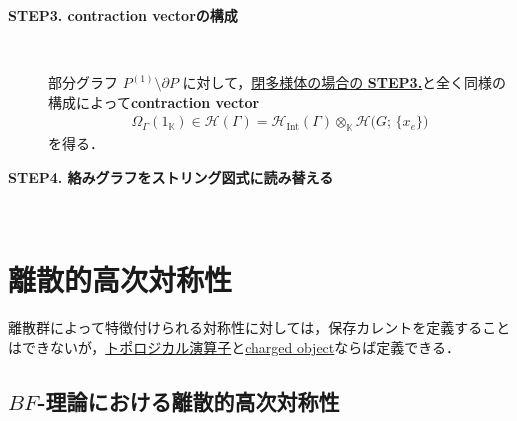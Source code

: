 \documentclass[TQFT_main]{subfiles}
\begin{document}
\begin{description}
    \item[\textbf{STEP3. contraction vectorの構成}]　
    
    部分グラフ $P^{(1)} \setminus \partial P$ に対して，\hyperref[TV:STEP3]{閉多様体の場合の \textsf{\textbf{STEP3.}}}と全く同様の構成によって\textbf{contraction vector}
    \begin{align}
        \Omega_\Gamma (1_{\mathbb{K}}) \in \mathcal{H} (\Gamma) = \mathcal{H}_{\text{Int}} (\Gamma) \otimes_{\mathbb{K}} \mathcal{H} \bigl(G;\, \{x_e\}\bigr)
    \end{align}
    を得る．

    \item[\textbf{STEP4. 絡みグラフをストリング図式に読み替える}]　
    

\end{description}


\section{離散的高次対称性}

離散群によって特徴付けられる対称性に対しては，保存カレントを定義することはできないが，\hyperref[def:p-form-sym]{トポロジカル演算子}と\hyperref[def:p-form-sym]{charged object}ならば定義できる．

\subsection{$BF$-理論における離散的高次対称性}
\end{document}

